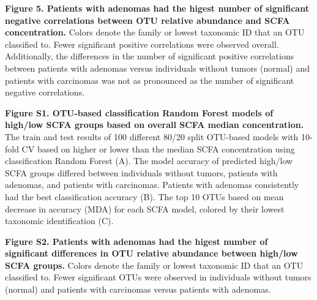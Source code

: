 \documentclass[11pt,]{article}
\begin{document}
\textbf{Figure 5. Patients with adenomas had the higest number of
significant negative correlations between OTU relative abundance and
SCFA concentration.} Colors denote the family or lowest taxonomic ID
that an OTU classified to. Fewer significant positive correlations were
observed overall. Additionally, the differences in the number of
significant positive correlations between patients with adenomas versus
individuals without tumors (normal) and patients with carcinomas was not
as pronounced as the number of significant negative correlations.

\newpage

\textbf{Figure S1. OTU-based classification Random Forest models of
high/low SCFA groups based on overall SCFA median concentration.} The
train and test results of 100 different 80/20 split OTU-based models
with 10-fold CV based on higher or lower than the median SCFA
concentration using classification Random Forest (A). The model accuracy
of predicted high/low SCFA groups differed between individuals without
tumors, patients with adenomas, and patients with carcinomas. Patients
with adenomas consistently had the best classification accuracy (B). The
top 10 OTUs based on mean decrease in accuracy (MDA) for each SCFA
model, colored by their lowest taxonomic identification (C).

\textbf{Figure S2. Patients with adenomas had the higest number of
significant differences in OTU relative abundance between high/low SCFA
groups.} Colors denote the family or lowest taxonomic ID that an OTU
classified to. Fewer significant OTUs were observed in individuals
without tumors (normal) and patients with carcinomas versus patients
with adenomas.
\end{document}
